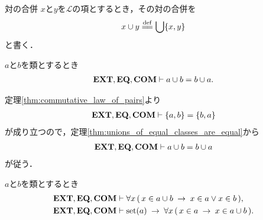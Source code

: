 	\begin{itembox}[l]{対の合併}
		$x$と$y$を$\mathcal{L}$の項とするとき，その対の合併を
		\begin{align}
			x \cup y \defeq \bigcup \{x,y\}
		\end{align}
		と書く．
	\end{itembox}
	
	\begin{screen}
		\begin{thm}[対の合併の対称性]
		\label{thm:symmetry_of_union_of_a_pair}
			$a$と$b$を類とするとき
			\begin{align}
				\mbox{{\bf EXT}},\mbox{{\bf EQ}},\mbox{\bf COM} \vdash a \cup b = b \cup a.
			\end{align}
		\end{thm}
	\end{screen}
	
	\begin{sketch}
		定理\ref{thm:commutative_law_of_pairs}より
		\begin{align}
			\mbox{{\bf EXT}},\mbox{{\bf EQ}},\mbox{\bf COM} \vdash \{a,b\} = \{b,a\}
		\end{align}
		が成り立つので，定理\ref{thm:unions_of_equal_classes_are_equal}から
		\begin{align}
			\mbox{{\bf EXT}},\mbox{{\bf EQ}},\mbox{\bf COM} \vdash a \cup b = b \cup a
		\end{align}
		が従う．
		\QED
	\end{sketch}
	
	\begin{screen}
		\begin{thm}[二つの集合の合併はそれぞれの要素を合わせたもの]
		\label{thm:union_of_pair_is_union_of_their_elements}
			$a$と$b$を類とするとき
			\begin{align}
				\mbox{{\bf EXT}},\mbox{{\bf EQ}},\mbox{\bf COM} &\vdash 
				\forall x\, (\, x \in a \cup b \hspace{0.25em}\rightarrow\hspace{0.25em} x \in a \vee x \in b\, ), \\
				\mbox{{\bf EXT}},\mbox{{\bf EQ}},\mbox{\bf COM} &\vdash 
				\operatorname*{set} (a) \hspace{0.25em}\rightarrow\hspace{0.25em} \forall x\, (\, x \in a \hspace{0.25em}\rightarrow\hspace{0.25em} x \in a \cup b\, ).
			\end{align}
		\end{thm}
	\end{screen}
	
